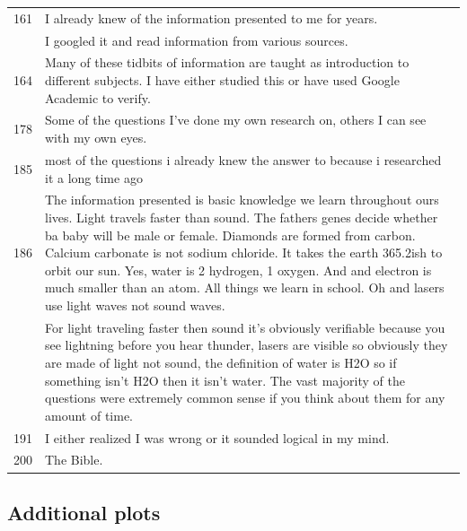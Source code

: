 \documentclass[
  doc,floatsintext]{apa6}
\begin{document}
\begin{longtable}[t]{>{}r>{\raggedright\arraybackslash}p{30em}}
161 & I already knew of the information presented to me for years.\\
\addlinespace
163 & I googled it and read information from various sources.\\
164 & Many of these tidbits of information are taught as introduction to different subjects. I have either studied this or have used Google  Academic to verify.\\
178 & Some of the questions I've done my own research on, others I can see with my own eyes.\\
185 & most of the questions i already knew the answer to because i researched it a long time ago\\
186 & The information presented is basic knowledge we learn throughout ours lives. Light travels faster than sound. The fathers genes decide whether ba baby will be male or female. Diamonds are formed from carbon. Calcium carbonate is not sodium chloride. It takes the earth 365.2ish to orbit our sun. Yes, water is 2 hydrogen, 1 oxygen. And and electron is much smaller than an atom. All things we learn in school. Oh and lasers use light waves not sound waves.\\
\addlinespace
187 & For light traveling faster then sound it's obviously verifiable because you see lightning before you hear thunder, lasers are visible so obviously they are made of light not sound, the definition of water is H2O so if something isn't H2O then it isn't water.  The vast majority of the questions were extremely common sense if you think about them for any amount of time.\\
191 & I either realized I was wrong or it sounded logical in my mind.\\
200 & The Bible.\\
\bottomrule
\end{longtable}

\subsection{Additional plots}\label{additional-plots-2}
\end{document}
